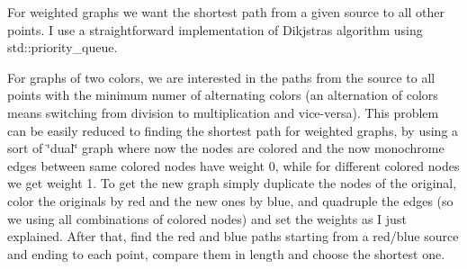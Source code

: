 \begin{DoxyItemize}
\item For weighted graphs we want the shortest path from a given source to all other points. I use a straightforward implementation of Dikjstra\textquotesingle{}s algorithm using std\+::priority\+\_\+queue.
\item For graphs of two colors, we are interested in the paths from the source to all points with the minimum numer of alternating colors (an alternation of colors means switching from division to multiplication and vice-\/versa). This problem can be easily reduced to finding the shortest path for weighted graphs, by using a sort of \char`\"{}dual\char`\"{} graph where now the nodes are colored and the now monochrome edges between same colored nodes have weight 0, while for different colored nodes we get weight 1. To get the new graph simply duplicate the nodes of the original, color the originals by red and the new ones by blue, and quadruple the edges (so we using all combinations of colored nodes) and set the weights as I just explained. After that, find the red and blue paths starting from a red/blue source and ending to each point, compare them in length and choose the shortest one. 
\end{DoxyItemize}